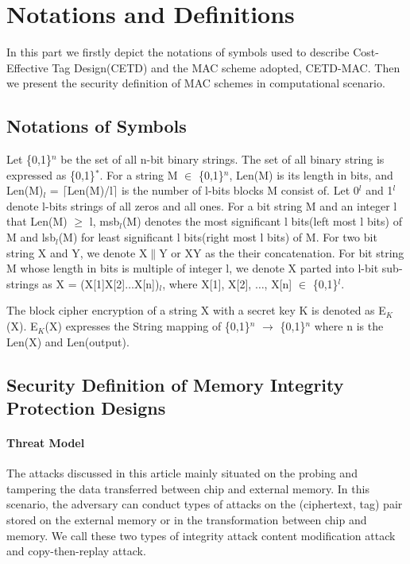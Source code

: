 \documentclass{article}
\begin{document}

\printnomenclature
\section{Notations and Definitions}
In this part we firstly depict the notations of symbols used to describe Cost-Effective Tag Design(CETD) and the MAC scheme adopted, CETD-MAC. Then we present the security definition of MAC schemes in computational scenario.
\subsection{Notations of Symbols}
Let \{0,1\}$^n$ be the set of all n-bit binary strings.  The set of all binary string is expressed as \{0,1\}$^*$.  
For a string M $\in$ \{0,1\}$^n$, Len(M) is its length in bits, and Len(M)$_l$ = $\lceil$Len(M)/l$\rceil$ is the number of l-bits blocks M consist of.  Let 0$^l$ and 1$^l$ denote l-bits strings of all zeros and all ones. 
For a bit string M and an integer l that Len(M) $\geq$ l, msb$_l$(M) denotes the most significant l bits(left most l bits) of M and lsb$_l$(M) for least significant l bits(right most l bits) of M.
For two bit string X and Y, we denote X$\|$Y  or XY as the their concatenation. For bit string M whose length in bits is multiple of integer l, we denote X parted into l-bit sub-strings as X = (X[1]X[2]$\ldots$X[n])$_l$, where X[1], X[2], $\ldots$, X[n] $\in$ \{0,1\}$^l$.

The block cipher encryption of a string X with a secret key K is denoted as E$_K$(X). E$_K$(X) expresses the String mapping of \{0,1\}$^n$ $\rightarrow$ \{0,1\}$^n$ where n is the Len(X) and Len(output).

\subsection{Security Definition of Memory Integrity Protection Designs}
\paragraph{Threat Model} %
The attacks discussed in this article mainly situated on the probing and
tampering the data transferred between chip and external memory. In this scenario, the adversary can conduct types of attacks on the (ciphertext, tag) pair stored on the external memory or in the transformation between chip and memory. We call these two types of integrity attack content modification attack and copy-then-replay attack. 
\end{document}
